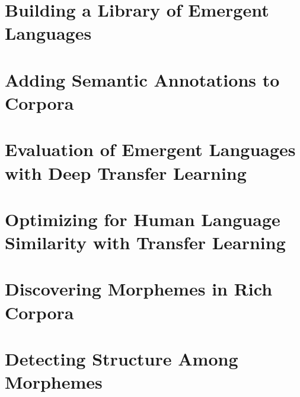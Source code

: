 






\newpage
\thispagestyle{plain}




\newpage
\tableofcontents*



\chapter{Building a Library of Emergent Languages }
\unskip\label{ch:elcc}


\chapter{Adding Semantic Annotations to Corpora }
\unskip\label{ch:rich-corpora}


\chapter{Evaluation of Emergent Languages with Deep Transfer Learning}
\unskip\label{ch:xferbench}


\chapter{Optimizing for Human Language Similarity with Transfer Learning }
\unskip\label{ch:hpo}


\chapter{Discovering Morphemes in Rich Corpora }
\unskip\label{ch:morphemes}


\chapter{Detecting Structure Among Morphemes }
\unskip\label{ch:syntax}




